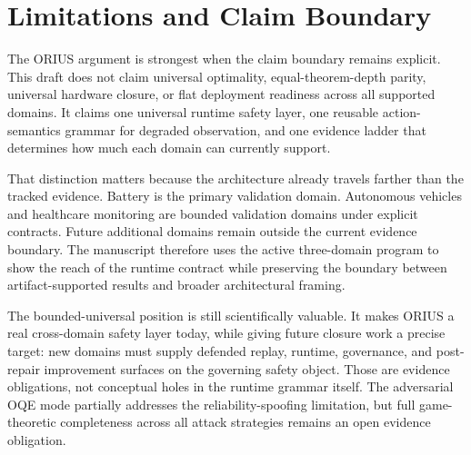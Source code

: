 \section{Limitations and Claim Boundary}
\label{sec:ieee-limitations}

The ORIUS argument is strongest when the claim boundary remains explicit. This draft
does not claim universal optimality, equal-theorem-depth parity, universal hardware
closure, or flat deployment readiness across all supported domains. It claims one
universal runtime safety layer, one reusable action-semantics grammar for degraded
observation, and one evidence ladder that determines how much each domain can currently
support.

That distinction matters because the architecture already travels farther than the
tracked evidence. Battery is the primary validation domain. Autonomous vehicles and
healthcare monitoring are bounded validation domains under explicit contracts. Future
additional domains remain outside the current evidence boundary. The manuscript
therefore uses the active three-domain program to show the reach of the runtime
contract while preserving the boundary between artifact-supported results and broader
architectural framing.

The bounded-universal position is still scientifically valuable. It makes ORIUS a real
cross-domain safety layer today, while giving future closure work a precise target:
new domains must supply defended replay, runtime, governance, and post-repair
improvement surfaces on the governing safety object. Those are evidence obligations,
not conceptual holes in the runtime grammar itself. The adversarial OQE mode
partially addresses the reliability-spoofing limitation, but full game-theoretic
completeness across all attack strategies remains an open evidence obligation.


